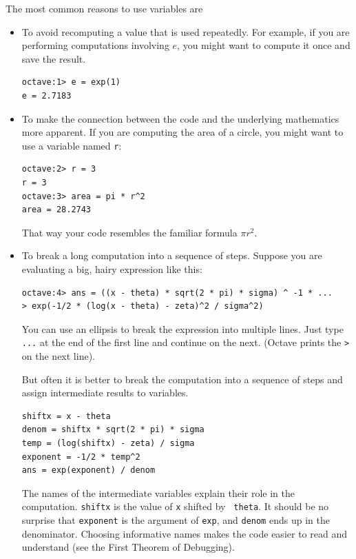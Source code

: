 \documentclass{book}
\begin{document}
The most common reasons to use variables are

\begin{itemize}

\item To avoid recomputing a value that is used repeatedly. For
example, if you are performing computations involving $e$, you might
want to compute it once and save the result.

\begin{verbatim}
octave:1> e = exp(1)
e = 2.7183
\end{verbatim}


\item To make the connection between the code and the underlying
mathematics more apparent. If you are computing the area of a circle,
you might want to use a variable named {\tt r}:

\begin{verbatim}
octave:2> r = 3
r = 3
octave:3> area = pi * r^2
area = 28.2743
\end{verbatim}

That way your code resembles the familiar formula $\pi r^2$.

\item To break a long computation into a sequence of steps.
Suppose you are evaluating a big, hairy expression like this:

\begin{verbatim}
octave:4> ans = ((x - theta) * sqrt(2 * pi) * sigma) ^ -1 * ...
> exp(-1/2 * (log(x - theta) - zeta)^2 / sigma^2)
\end{verbatim}

You can use an ellipsis to break the expression into multiple lines.
Just type {\tt ...} at the end of the first line and
continue on the next. (Octave prints the {\tt >} on the next line).

But often it is better to break the computation into a sequence of
steps and assign intermediate results to variables.

\begin{verbatim}
shiftx = x - theta
denom = shiftx * sqrt(2 * pi) * sigma
temp = (log(shiftx) - zeta) / sigma
exponent = -1/2 * temp^2
ans = exp(exponent) / denom
\end{verbatim}

The names of the intermediate variables explain their role in the
computation. {\tt shiftx} is the value of {\tt x} shifted by {\tt
theta}. It should be no surprise that {\tt exponent} is the argument
of {\tt exp}, and {\tt denom} ends up in the denominator. Choosing
informative names makes the code easier to read and understand (see
the First Theorem of Debugging).

\end{itemize}
\end{document}
